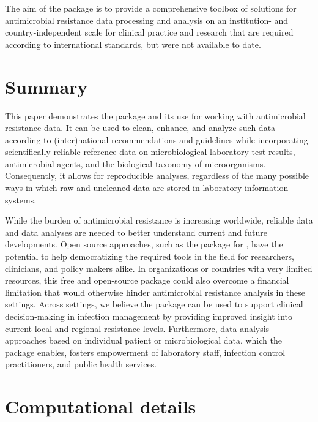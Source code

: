 \documentclass[article, shortnames]{jss}
\begin{document}
The aim of the  package is to provide a comprehensive toolbox of
solutions for antimicrobial resistance data processing and analysis on an
institution- and country-independent scale for clinical practice and
research that are required according to international standards, but were
not available to date.


\section{Summary} \label{sec:summary}

This paper demonstrates the  package and its use for working with
antimicrobial resistance data.  It can be used to clean, enhance, and
analyze such data according to (inter)national recommendations and
guidelines while incorporating scientifically reliable reference data on
microbiological laboratory test results, antimicrobial agents, and the
biological taxonomy of microorganisms.  Consequently, it allows for
reproducible analyses, regardless of the many possible ways in which raw and
uncleaned data are stored in laboratory information systems.

While the burden of antimicrobial resistance is increasing worldwide,
reliable data and data analyses are needed to better understand current and
future developments.  Open source approaches, such as the  package
for , have the potential to help democratizing the required
tools in the field for researchers, clinicians, and policy makers alike.  In
organizations or countries with very limited resources, this free and
open-source package could also overcome a financial limitation that would
otherwise hinder antimicrobial resistance analysis in these settings. 
Across settings, we believe the  package can be used to support
clinical decision-making in infection management by providing improved
insight into current local and regional resistance levels.  Furthermore,
data analysis approaches based on individual patient or microbiological
data, which the  package enables, fosters empowerment of laboratory
staff, infection control practitioners, and public health services.



\section*{Computational details}
\end{document}
